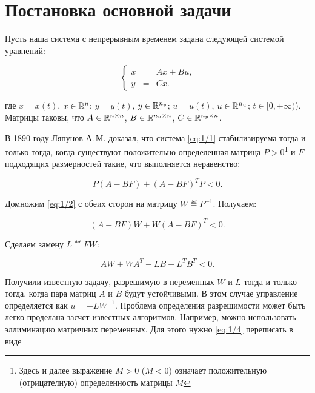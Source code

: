 \chapter{Постановка основной задачи}

Пусть наша система с непрерывным временем задана следующей системой уравнений:

\begin{equation}
\label{eq:1/1}
\left\{ \begin{array}{rcl}
        \dot{x}&=&Ax + Bu\mbox{,} \\
        y&=&Cx\mbox{.}
       \end{array} \right.
\end{equation}

где $x=x(t)$, $x \in \mathbb{R}^{n}$; $y=y(t)$, $y \in \mathbb{R}^{n_y}$; $u=u(t)$, $u \in \mathbb{R}^{n_u}$; $t \in [0, +\infty)$). Матрицы таковы, что $A \in \mathbb{R}^{{n} \times {n}}$, $B \in \mathbb{R}^{{n_u} \times {n}}$, $C \in \mathbb{R}^{{n_y} \times {n}}$.

В 1890 году Ляпунов А.\,М. доказал, что система \vref{eq:1/1} стабилизируема тогда и только тогда, когда существуют положительно определенная матрица $P>0$\footnote{Здесь и далее выражение $M>0$ ($M<0$) означает положительную (отрицателную) определенность матрицы $M$} и $F$ подходящих размерностей такие, что выполняется неравенство:

\begin{equation}
\label{eq:1/2}
P(A-BF) + (A-BF)^TP < 0\mbox{.}
\end{equation}

Домножим \vref{eq:1/2} с обеих сторон на матрицу $W \eqdef P^{-1}$. Получаем:

\begin{equation}
\label{eq:1/3}
(A-BF)W + W(A-BF)^T < 0\mbox{.}
\end{equation}

Сделаем замену $L \eqdef FW$:

\begin{equation}
\label{eq:1/4}
AW + WA^T - LB - L^TB^T < 0\mbox{.}
\end{equation}

Получили известную задачу\cite{BOYD}, разрешимую в переменных $W$ и $L$ тогда и только тогда, когда пара матриц $A$ и $B$ будут устойчивыми. В этом случае управление определяется как $u=-LW^{-1}$. Проблема определения разрешимости может быть легко проделана засчет известных алгоритмов\cite{BOYD}. Например, можно использовать эллиминацию матричных переменных. Для этого нужно \vref{eq:1/4} переписать в виде

